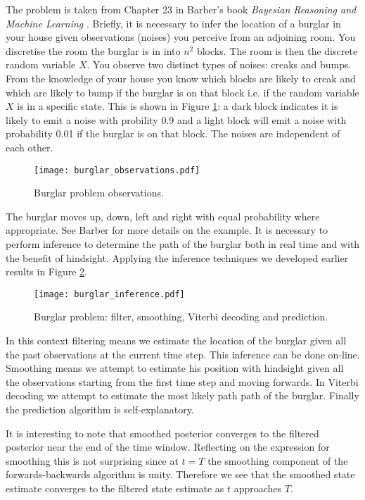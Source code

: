 The problem is taken from Chapter 23 in Barber's book \textit{Bayesian Reasoning and Machine Learning} \cite{barber}. Briefly, it is necessary to infer the location of a burglar in your house given observations (noises) you perceive from an adjoining room. You discretise the room the burglar is in into $n^2$ blocks. The room is then the discrete random variable $X$. You observe two distinct types of noises: creaks and bumps. From the knowledge of your house you know which blocks are likely to creak and which are likely to bump if the burglar is on that block i.e. if the random variable $X$ is in a specific state. This is shown in Figure \ref{fig_burlgar_observations}: a dark block indicates it is likely to emit a noise with probility 0.9 and a light block will emit a noise with probability 0.01 if the burglar is on that block. The noises are independent of each other.
\begin{figure}[H] 
\centering
\texttt{[image: burglar\_observations.pdf]}
\caption{Burglar problem observations.}
\label{fig_burlgar_observations}
\end{figure}
The burglar moves up, down, left and right with equal probability where appropriate. See Barber for more details on the example. It is necessary to perform inference to determine the path of the burglar both in real time and with the benefit of hindsight. Applying the inference techniques we developed earlier results in Figure \ref{fig_burglar_inference}. 
\begin{figure}[H] 
\centering
\texttt{[image: burglar\_inference.pdf]}
\caption{Burglar problem: filter, smoothing, Viterbi decoding and prediction.}
\label{fig_burglar_inference}
\end{figure}
In this context filtering means we estimate the location of the burglar given all the past observations at the current time step. This inference can be done on-line. Smoothing means we attempt to estimate his position with hindsight given all the observations starting from the first time step and moving forwards. In Viterbi decoding we attempt to estimate the most likely path path of the burglar. Finally the prediction algorithm is self-explanatory.

It is interesting to note that smoothed posterior converges to the filtered posterior near the end of the time window. Reflecting on the expression for smoothing this is not surprising since at $t=T$ the smoothing component of the forwards-backwards algorithm is unity. Therefore we see that the smoothed state estimate converges to the filtered state estimate as $t$ approaches $T$.

